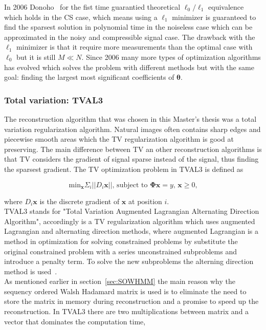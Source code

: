 In 2006 Donoho~\cite{article:CS_donoho1} for the fist time guarantied theoretical $\ell_0\text{/}\ell_1$ equivalence which holds in the CS case, which means using a $\ell_1$ minimizer is guaranteed to find the sparsest solution in polynomial time in the noiseless case which can be approximated in the noisy and compressible signal case. The drawback with the $\ell_1$ minimizer is that it require more measurements than the optimal case with $\ell_0$ but it is still $M \ll N$. Since 2006 many more types of optimization algorithms has evolved which solves the problem with different methods but with the same goal: finding the largest most significant coefficients of $\mathbf{\theta}$. 


\subsubsection{Total variation: TVAL3}
\label{sec:TV}
The reconstruction algorithm that was chosen in this Master's thesis was a total variation regularization algorithm. Natural images often contains sharp edges and piecewise smooth areas which the TV regularization algorithm is good at preserving. The main difference between TV an other reconstruction algorithms is that TV considers the gradient of signal sparse instead of the signal, thus finding the sparsest gradient. The TV optimization problem in TVAL3 is defined as  

\begin{equation}
\text{min}_\mathbf{x} \Sigma_i ||D_i \mathbf{x} || \text{, subject to } \mathbf{\Phi x} = 	y \text{, } \mathbf{x} \geq 0 \text{,} 
\end{equation}

where $D_i\mathbf{x}$ is the discrete gradient of $\mathbf{x}$ at position $i$.\\[0.1in]

TVAL3 stands for "Total Variation Augmented Lagrangian Alternating Direction Algorithm", accordingly is a TV regularization algorithm which uses augmented Lagrangian and alternating direction methods, where augmented Lagrangian is a method in optimization for solving constrained problems by substitute the original constrained problem with a series unconstrained subproblems and introduce a penalty term. To solve the new subproblems the alterning direction method is used~\cite{article:TVAL3}.\\[0.1in]

As mentioned earlier in section~\ref{sec:SOWHMM} the main reason why the sequency ordered Walsh Hadamard matrix is used is to eliminate the need to store the matrix in memory during reconstruction and a promise to speed up the reconstruction. In TVAL3 there are two multiplications between matrix and a vector that dominates the computation time,

